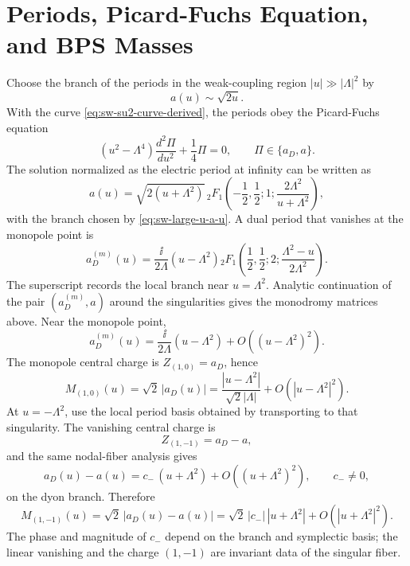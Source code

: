 \section{Periods, Picard-Fuchs Equation, and BPS Masses}

Choose the branch of the periods in the weak-coupling region
\(|u|\gg|\Lambda|^2\) by
\[
  a(u)\sim\sqrt{2u}.
\]
With the curve \eqref{eq:sw-su2-curve-derived}, the periods obey the
Picard-Fuchs equation
\begin{equation}
  (u^2-\Lambda^4)\frac{d^2\Pi}{du^2}
  +
  \frac14\Pi=0,
  \qquad
  \Pi\in\{a_D,a\}.
  \label{eq:sw-picard-fuchs-equation}
\end{equation}
The solution normalized as the electric period at infinity can be written as
\begin{equation}
  a(u)
  =
  \sqrt{2(u+\Lambda^2)}\,
  {}_2F_1
  \left(
    -\frac12,\frac12;1;
    \frac{2\Lambda^2}{u+\Lambda^2}
  \right),
  \label{eq:sw-electric-period-hypergeometric}
\end{equation}
with the branch chosen by \eqref{eq:sw-large-u-a-u}.  A dual period that
vanishes at the monopole point is
\begin{equation}
  a_D^{(m)}(u)
  =
  \frac{\ii}{2\Lambda}(u-\Lambda^2)
  {}_2F_1
  \left(
    \frac12,\frac12;2;
    \frac{\Lambda^2-u}{2\Lambda^2}
  \right).
  \label{eq:sw-monopole-period-hypergeometric}
\end{equation}
The superscript records the local branch near \(u=\Lambda^2\).  Analytic
continuation of the pair
\((a_D^{(m)},a)\) around the singularities gives the monodromy matrices above.
Near the monopole point,
\begin{equation}
  a_D^{(m)}(u)
  =
  \frac{\ii}{2\Lambda}(u-\Lambda^2)
  +O((u-\Lambda^2)^2).
  \label{eq:sw-monopole-period-linear}
\end{equation}
The monopole central charge is \(Z_{(1,0)}=a_D\), hence
\begin{equation}
  M_{(1,0)}(u)
  =
  \sqrt2\,|a_D(u)|
  =
  \frac{|u-\Lambda^2|}{\sqrt2|\Lambda|}
  +O(|u-\Lambda^2|^2).
  \label{eq:sw-monopole-mass-near-singularity}
\end{equation}
At \(u=-\Lambda^2\), use the local period basis obtained by transporting to
that singularity.  The vanishing central charge is
\[
  Z_{(1,-1)}=a_D-a,
\]
and the same nodal-fiber analysis gives
\begin{equation}
  a_D(u)-a(u)
  =
  c_-\,(u+\Lambda^2)
  +
  O((u+\Lambda^2)^2),
  \qquad
  c_-\neq0,
  \label{eq:sw-dyon-period-linear}
\end{equation}
on the dyon branch.  Therefore
\begin{equation}
  M_{(1,-1)}(u)
  =
  \sqrt2\,|a_D(u)-a(u)|
  =
  \sqrt2\,|c_-|\,|u+\Lambda^2|
  +O(|u+\Lambda^2|^2).
  \label{eq:sw-dyon-mass-near-singularity}
\end{equation}
The phase and magnitude of \(c_-\) depend on the branch and symplectic basis;
the linear vanishing and the charge \((1,-1)\) are invariant data of the
singular fiber.


